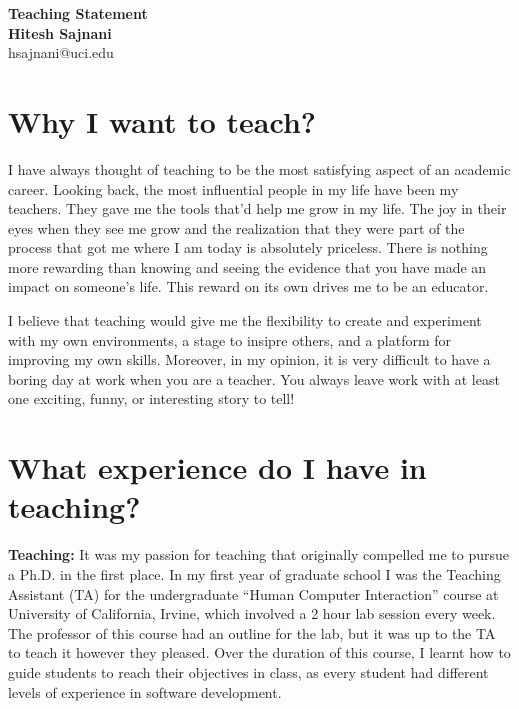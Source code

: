 \documentclass[a4paper]{article}
\begin{document}

\begin{center}
{\LARGE \textbf{Teaching Statement}} \\[.3in]
{\large  \textbf{Hitesh Sajnani}} \\
{\small hsajnani@uci.edu}
\end{center}
\pagestyle{fancy}
\lhead{\textcolor{black}{\it Hitesh Sajnani}}
\rhead{\textcolor{black}{\thepage/\pageref{LastPage}}}



\section*{Why I want to teach?}
I have always thought of teaching to be the most satisfying aspect of an academic career. Looking back, the most influential people in my life have been my teachers. 
They gave me the tools that'd help me grow in my life. The joy in their eyes when they see me grow and the realization that they were part of the process that got me where I am today is absolutely priceless.  
There is nothing more rewarding than knowing and seeing the evidence that you have made an impact on someone’s life. This reward on its own drives me to be an educator. 

I believe that teaching would give me the flexibility to create and experiment with my own environments, a stage to insipre others, and a platform for improving my own skills.  
Moreover, in my opinion, it is very difficult to have a boring day at work when you are a teacher. You always leave work with at least one exciting, funny, or interesting story to tell!

\section*{What experience do I have in teaching?}
\textbf{Teaching:} It was my passion for teaching that originally compelled me to pursue a Ph.D. in the first
place. In my first year of graduate school I was the Teaching Assistant (TA) for the undergraduate
\enquote{Human Computer Interaction} course at University of California, Irvine, which involved a 2 hour lab session
every week. The professor of this course had an outline for the lab, but it was up to the TA to teach it however they pleased. Over the
duration of this course,  I learnt how to guide students to reach their objectives in class, as every student had different levels of experience in software development. 
\end{document}

